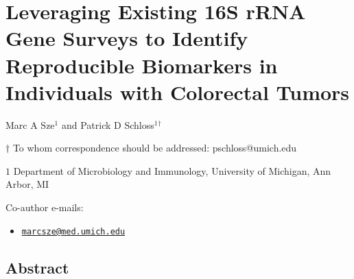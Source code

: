 \documentclass[12pt,]{article}
\title{}
\author{}
\date{}
\providecommand{\tightlist}{%
  \setlength{\itemsep}{0pt}\setlength{\parskip}{0pt}}
\begin{document}
\section{Leveraging Existing 16S rRNA Gene Surveys to Identify
Reproducible Biomarkers in Individuals with Colorectal
Tumors}\label{leveraging-existing-16s-rrna-gene-surveys-to-identify-reproducible-biomarkers-in-individuals-with-colorectal-tumors}

\begin{center}
\vspace{25mm}

Marc A Sze${^1}$ and Patrick D Schloss${^1}$${^\dagger}$

\vspace{20mm}

$\dagger$ To whom correspondence should be addressed: pschloss@umich.edu

$1$ Department of Microbiology and Immunology, University of Michigan, Ann Arbor, MI




\end{center}

Co-author e-mails:

 \begin{itemize} 
\tightlist
\item
  \href{mailto:marcsze@med.umich.edu}{\nolinkurl{marcsze@med.umich.edu}}
 \end{itemize} 

\newpage

\linenumbers

\subsection{Abstract}\label{abstract}
\end{document}
